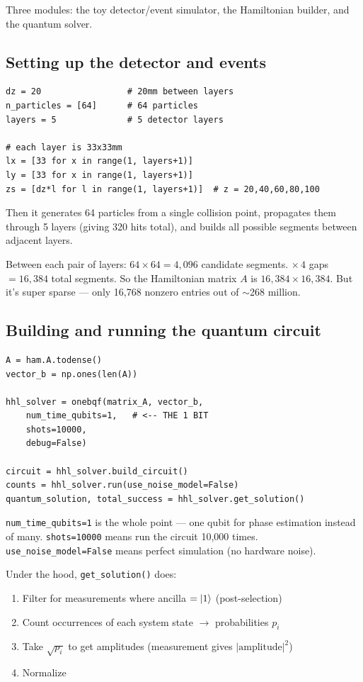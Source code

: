 \documentclass[11pt, a4paper]{article}
\begin{document}
Three modules: the toy detector/event simulator, the Hamiltonian builder,
and the quantum solver.

\subsection{Setting up the detector and events}

\begin{lstlisting}
dz = 20                 # 20mm between layers
n_particles = [64]      # 64 particles
layers = 5              # 5 detector layers

# each layer is 33x33mm
lx = [33 for x in range(1, layers+1)]
ly = [33 for x in range(1, layers+1)]
zs = [dz*l for l in range(1, layers+1)]  # z = 20,40,60,80,100
\end{lstlisting}

Then it generates 64 particles from a single collision point, propagates
them through 5 layers (giving 320 hits total), and builds all possible
segments between adjacent layers.

\begin{tcolorbox}[nb]
Between each pair of layers: $64 \times 64 = 4{,}096$ candidate segments.
$\times\, 4$ gaps $= 16{,}384$ total segments. So the Hamiltonian matrix
$A$ is $16{,}384 \times 16{,}384$. But it's super sparse --- only 16,768
nonzero entries out of $\sim$268 million.
\end{tcolorbox}

\subsection{Building and running the quantum circuit}

\begin{lstlisting}
A = ham.A.todense()
vector_b = np.ones(len(A))

hhl_solver = onebqf(matrix_A, vector_b,
    num_time_qubits=1,   # <-- THE 1 BIT
    shots=10000,
    debug=False)

circuit = hhl_solver.build_circuit()
counts = hhl_solver.run(use_noise_model=False)
quantum_solution, total_success = hhl_solver.get_solution()
\end{lstlisting}

\texttt{num\_time\_qubits=1} is the whole point --- one qubit for phase
estimation instead of many. \texttt{shots=10000} means run the circuit
10,000 times. \texttt{use\_noise\_model=False} means perfect simulation
(no hardware noise).

\medskip
Under the hood, \texttt{get\_solution()} does:
\begin{enumerate}
  \item Filter for measurements where ancilla $= \ket{1}$ (post-selection)
  \item Count occurrences of each system state $\to$ probabilities $p_i$
  \item Take $\sqrt{p_i}$ to get amplitudes (measurement gives
        $|\text{amplitude}|^2$)
  \item Normalize
\end{enumerate}
\end{document}
